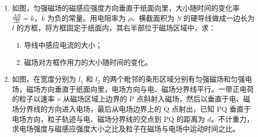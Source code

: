 \documentclass[\gkver]{gaokaozhenti}
\begin{document}
\begin{enumerate}
{（3）设抛出点为势能零点，则开始下滑时的机械能为 $E_{1}=mgh=mg/2$，抛出时的机械能为 $E_{2}=\frac{1}{2}mv_{0}^{2}=4.5m$，则根据 $\frac{E_{1}-E_{2}}{E_{1}}=0.082$。
}

\item
如图，匀强磁场的磁感应强度方向垂直于纸面向里，大小随时间的变化率 $\frac{\Delta B}{\Delta t}=k$，$k$ 为负的常量。用电阻率为 $\rho$、横截面积为 $S$ 的硬导线做成一边长为 $l$ 的方框，将方框固定于纸面内，其右半部位于磁场区域中，求：
\begin{enumerate}
	\item
	导线中感应电流的大小；
	\item
	磁场对方框作用力的大小随时间的变化。
\end{enumerate}



\item
如图，在宽度分别为 $l_{1}$ 和 $l_{2}$ 的两个毗邻的条形区域分别有匀强磁场和匀强电场，磁场方向垂直于纸面向里，电场方向与电、磁场分界线平行。一带正电荷的粒子以速率 $v$ 从磁场区域上边界的 P 点斜射入磁场，然后以垂直于电、磁场分界线的方向进入电场，最后从电场边界上的 Q 点射出，已知 PQ 垂直于电场方向，粒子轨迹与电、磁场分界线的交点到 PQ 的距离为 $d$。不计重力，求电场强度与磁感应强度大小之比及粒子在磁场与电场中运动时间之比。


\end{enumerate}
\end{document}
